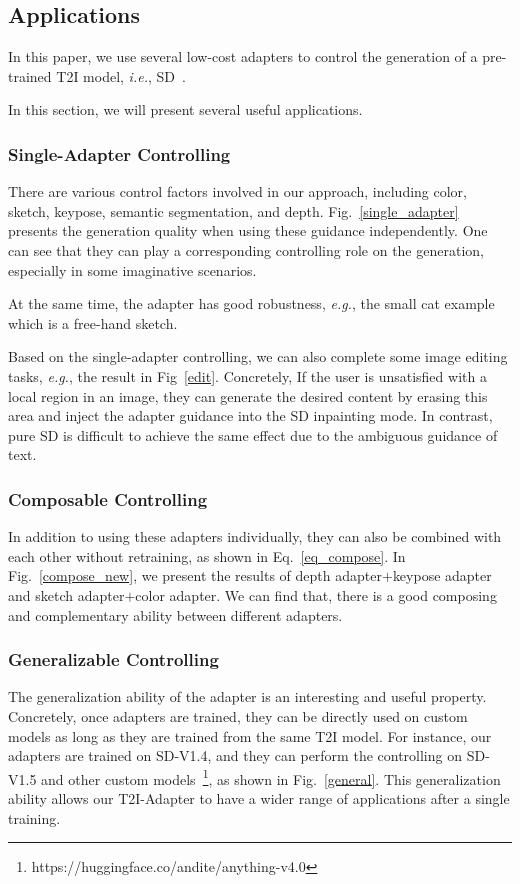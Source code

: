 \subsection{Applications}
In this paper, we use several low-cost adapters to control the generation of a pre-trained T2I model, \textit{i.e.}, SD~\cite{ldm}. 

In this section, we will present several useful applications.

\subsubsection{Single-Adapter Controlling} There are various control factors involved in our approach, including color, sketch, keypose, semantic segmentation, and depth. Fig.~\ref{single_adapter} presents the generation quality when using these guidance independently. One can see that they can play a corresponding controlling role on the generation, especially in some imaginative scenarios. 

At the same time, the adapter has good robustness, \textit{e.g.}, the small cat example which is a free-hand sketch. 

Based on the single-adapter controlling, we can also complete some image editing tasks, \textit{e.g.}, the result in Fig~\ref{edit}. Concretely, If the user is unsatisfied with a local region in an image, they can generate the desired content by erasing this area and inject the adapter guidance into the SD inpainting mode. In contrast, pure SD is difficult to achieve the same effect due to the ambiguous guidance of text.

\subsubsection{Composable Controlling}
\label{sec_comp}
In addition to using these adapters individually, they can also be combined with each other without retraining, as shown in Eq.~\ref{eq_compose}. In Fig.~\ref{compose_new}, we present the results of depth adapter$+$keypose adapter and sketch adapter$+$color adapter. We can find that, there is a good composing and complementary ability between different adapters. 

\subsubsection{Generalizable Controlling} The generalization ability of the adapter is an interesting and useful property. Concretely, once adapters are trained, they can be directly used on custom models as long as they are trained from the same T2I model. For instance, our adapters are trained on SD-V1.4, and they can perform the controlling on SD-V1.5 and other custom models~\footnote{https://huggingface.co/andite/anything-v4.0}, as shown in Fig.~\ref{general}. This generalization ability allows our T2I-Adapter to have a wider range of applications after a single training.

